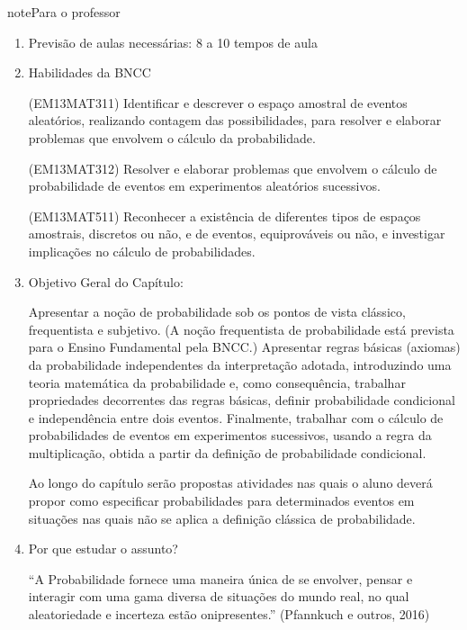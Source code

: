\clearpage



\label{\detokenize{PE511:probabilidade}}\label{\detokenize{PE511::doc}}
\begin{sphinxadmonition}{note}{Para o professor}

\begin{enumerate}
\item {} 
Previsão de aulas necessárias:   8 a 10 tempos de aula

\item {} 
Habilidades da BNCC

(EM13MAT311) Identificar e descrever o espaço amostral de eventos aleatórios, realizando contagem das possibilidades, para resolver e elaborar problemas que envolvem o cálculo da probabilidade.

(EM13MAT312) Resolver e elaborar problemas que envolvem o cálculo de probabilidade de eventos em experimentos aleatórios sucessivos.

(EM13MAT511) Reconhecer a existência de diferentes tipos de espaços amostrais, discretos ou não, e de eventos, equiprováveis ou não, e investigar implicações no cálculo de probabilidades.

\item {} 
Objetivo Geral do Capítulo:

Apresentar a noção de probabilidade sob os pontos de vista clássico,  frequentista e subjetivo. (A noção frequentista de probabilidade está prevista para o Ensino Fundamental pela BNCC.) Apresentar regras básicas (axiomas) da probabilidade independentes da interpretação adotada, introduzindo  uma teoria matemática da probabilidade e, como consequência, trabalhar propriedades decorrentes das regras básicas, definir probabilidade condicional e independência entre dois eventos. Finalmente, trabalhar com o cálculo de probabilidades de eventos em experimentos sucessivos, usando a regra da multiplicação, obtida a partir da definição de probabilidade condicional.

Ao longo do capítulo serão propostas atividades nas quais o aluno deverá propor como especificar probabilidades para determinados eventos em situações nas quais não se aplica a definição clássica de probabilidade.

\item {} 
Por que estudar o assunto?

“A Probabilidade fornece uma maneira única de se envolver, pensar e interagir com uma gama diversa de situações do mundo real, no qual aleatoriedade e incerteza estão onipresentes.” (Pfannkuch e outros, 2016)


\end{enumerate}
\end{sphinxadmonition}
